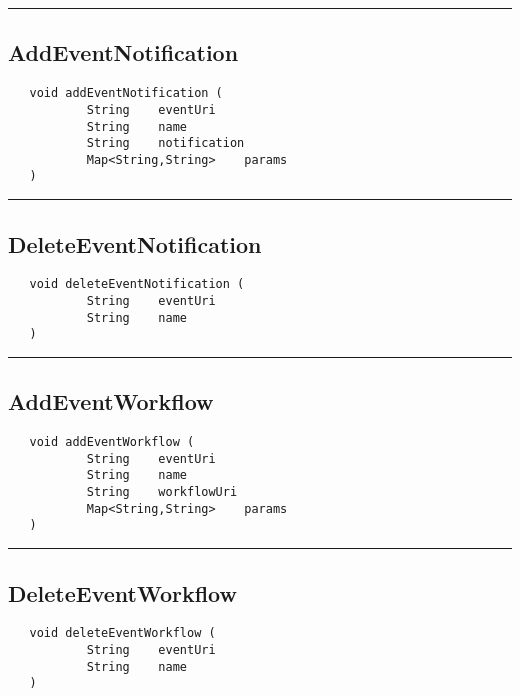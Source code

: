 \rule{15cm}{2pt}
\subsection{AddEventNotification}
\label{Api:AddEventNotification}
\begin{verbatim}
   void addEventNotification (
           String    eventUri
           String    name
           String    notification
           Map<String,String>    params
   )
\end{verbatim}



\rule{15cm}{2pt}
\subsection{DeleteEventNotification}
\label{Api:DeleteEventNotification}
\begin{verbatim}
   void deleteEventNotification (
           String    eventUri
           String    name
   )
\end{verbatim}



\rule{15cm}{2pt}
\subsection{AddEventWorkflow}
\label{Api:AddEventWorkflow}
\begin{verbatim}
   void addEventWorkflow (
           String    eventUri
           String    name
           String    workflowUri
           Map<String,String>    params
   )
\end{verbatim}



\rule{15cm}{2pt}
\subsection{DeleteEventWorkflow}
\label{Api:DeleteEventWorkflow}
\begin{verbatim}
   void deleteEventWorkflow (
           String    eventUri
           String    name
   )
\end{verbatim}



